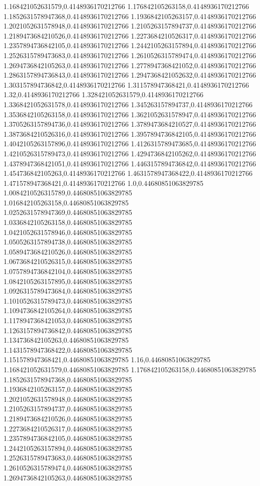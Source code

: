 1.168421052631579,0.4148936170212766
1.176842105263158,0.4148936170212766
1.1852631578947368,0.4148936170212766
1.1936842105263157,0.4148936170212766
1.2021052631578948,0.4148936170212766
1.2105263157894737,0.4148936170212766
1.2189473684210526,0.4148936170212766
1.2273684210526317,0.4148936170212766
1.2357894736842105,0.4148936170212766
1.2442105263157894,0.4148936170212766
1.2526315789473683,0.4148936170212766
1.2610526315789474,0.4148936170212766
1.2694736842105263,0.4148936170212766
1.2778947368421052,0.4148936170212766
1.2863157894736843,0.4148936170212766
1.2947368421052632,0.4148936170212766
1.303157894736842,0.4148936170212766
1.311578947368421,0.4148936170212766
1.32,0.4148936170212766
1.328421052631579,0.4148936170212766
1.3368421052631578,0.4148936170212766
1.345263157894737,0.4148936170212766
1.3536842105263158,0.4148936170212766
1.3621052631578947,0.4148936170212766
1.3705263157894736,0.4148936170212766
1.3789473684210527,0.4148936170212766
1.3873684210526316,0.4148936170212766
1.3957894736842105,0.4148936170212766
1.4042105263157896,0.4148936170212766
1.4126315789473685,0.4148936170212766
1.4210526315789473,0.4148936170212766
1.4294736842105262,0.4148936170212766
1.4378947368421051,0.4148936170212766
1.4463157894736842,0.4148936170212766
1.454736842105263,0.4148936170212766
1.4631578947368422,0.4148936170212766
1.471578947368421,0.4148936170212766
1.0,0.44680851063829785
1.0084210526315789,0.44680851063829785
1.016842105263158,0.44680851063829785
1.0252631578947369,0.44680851063829785
1.0336842105263158,0.44680851063829785
1.0421052631578946,0.44680851063829785
1.0505263157894738,0.44680851063829785
1.0589473684210526,0.44680851063829785
1.0673684210526315,0.44680851063829785
1.0757894736842104,0.44680851063829785
1.0842105263157895,0.44680851063829785
1.0926315789473684,0.44680851063829785
1.1010526315789473,0.44680851063829785
1.1094736842105264,0.44680851063829785
1.1178947368421053,0.44680851063829785
1.1263157894736842,0.44680851063829785
1.134736842105263,0.44680851063829785
1.1431578947368422,0.44680851063829785
1.151578947368421,0.44680851063829785
1.16,0.44680851063829785
1.168421052631579,0.44680851063829785
1.176842105263158,0.44680851063829785
1.1852631578947368,0.44680851063829785
1.1936842105263157,0.44680851063829785
1.2021052631578948,0.44680851063829785
1.2105263157894737,0.44680851063829785
1.2189473684210526,0.44680851063829785
1.2273684210526317,0.44680851063829785
1.2357894736842105,0.44680851063829785
1.2442105263157894,0.44680851063829785
1.2526315789473683,0.44680851063829785
1.2610526315789474,0.44680851063829785
1.2694736842105263,0.44680851063829785
